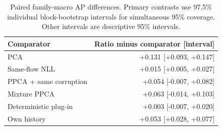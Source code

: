 \begin{table}[t]
\centering
\caption{Paired family-macro AP differences. Primary contrasts use 97.5\% individual block-bootstrap intervals for simultaneous 95\% coverage. Other intervals are descriptive 95\% intervals.}
\label{tab:contrasts}
\small
\begin{tabular}{lr}
\toprule
Comparator & Ratio minus comparator [interval] \\
\midrule
PCA & +0.131 [+0.093, +0.147] \\
Same-flow NLL & +0.015 [+0.005, +0.027] \\
PPCA + same corruption & +0.054 [-0.007, +0.082] \\
Mixture PPCA & +0.063 [-0.014, +0.103] \\
Deterministic plug-in & +0.003 [-0.007, +0.020] \\
Own history & +0.053 [+0.028, +0.077] \\
\bottomrule
\end{tabular}
\end{table}
